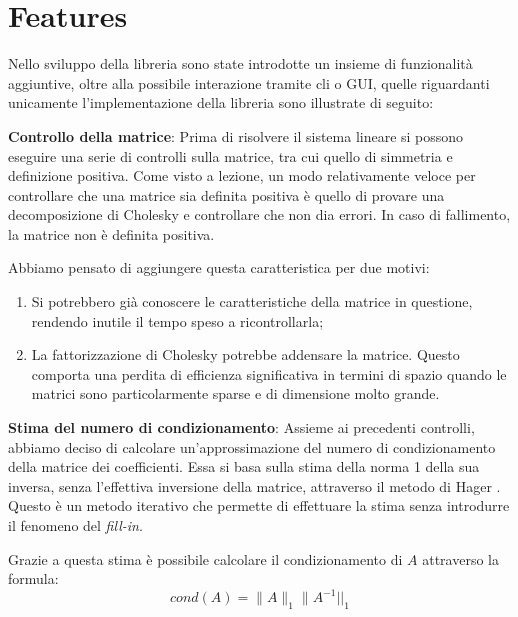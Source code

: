 \section{Features}

Nello sviluppo della libreria sono state introdotte un insieme di funzionalità aggiuntive, oltre alla possibile interazione tramite cli o GUI, quelle riguardanti unicamente l'implementazione della libreria sono illustrate di seguito:

\begin{itemize}
	\begin{item}
		\textbf{Controllo della matrice}: Prima di risolvere il sistema lineare si possono eseguire una serie di controlli sulla matrice, tra cui quello di simmetria e definizione positiva. Come visto a lezione, un modo relativamente veloce per controllare che una matrice sia definita positiva è quello di provare una decomposizione di Cholesky e controllare che non dia errori. In caso di fallimento, la matrice non è definita positiva.
		
		Abbiamo pensato di aggiungere questa caratteristica per due motivi:
			\begin{enumerate}
				\item Si potrebbero già conoscere le caratteristiche della matrice in questione, rendendo inutile il tempo speso a ricontrollarla;
				\item La fattorizzazione di Cholesky potrebbe addensare la matrice. Questo comporta una perdita di efficienza significativa in termini di spazio quando le matrici sono particolarmente sparse e di dimensione molto grande.
			\end{enumerate}
	\end{item}
	\begin{item}
		\textbf{Stima del numero di condizionamento}: Assieme ai precedenti controlli, abbiamo deciso di calcolare un'approssimazione del numero di condizionamento della matrice dei coefficienti. Essa si basa sulla stima della norma 1 della sua inversa, senza l'effettiva inversione della matrice, attraverso il metodo di Hager \cite{hager, hager2}. Questo è un metodo iterativo che permette di effettuare la stima senza introdurre il fenomeno del \textit{fill-in}.
		
		Grazie a questa stima è possibile calcolare il condizionamento di $A$ attraverso la formula:
		$$ cond(A) = \|A\|_1  \|A^{-1}||_1$$
			

\end{item}
\end{itemize}

